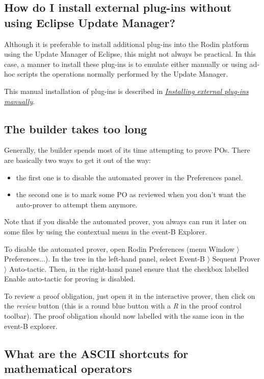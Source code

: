 \subsection{How do I install external plug-ins without using Eclipse Update Manager?}

Although it is preferable to install additional plug-ins into the Rodin platform using the Update Manager of Eclipse, this might not always be practical. In this case, a manner to install these plug-ins is to emulate either manually or using ad-hoc scripts the operations normally performed by the Update Manager. 

This manual installation of plug-ins is described in \href{http://wiki.event-b.org/index.php/Installing_external_plug-ins_manually}{\emph{Installing external plug-ins manually}}. 

\subsection{The builder takes too long}

Generally, the builder spends most of its time attempting to prove POs. There are basically two ways to get it out of the way: 

\begin{itemize}
	\item the first one is to disable the automated prover in the Preferences panel. 
	\item the second one is to mark some PO as reviewed when you don't want the auto-prover to attempt them anymore. 
\end{itemize}

Note that if you disable the automated prover, you always can run it later on some files by using the contextual menu in the event-B Explorer. 

To disable the automated prover, open Rodin Preferences 
(menu \textsf{Window $\rangle$ Preferences...}). In the tree in the left-hand panel, select \textsf{Event-B $\rangle$ Sequent Prover $\rangle$ Auto-tactic}. Then, in the right-hand panel ensure that the checkbox labelled Enable \textsf{auto-tactic} for proving is disabled. 

To review a proof obligation, just open it in the interactive prover, then click on the \emph{review} button (this is a round blue button with a \emph{R} in the proof control toolbar). The proof obligation should now labelled with the same icon in the event-B explorer. 

\subsection{What are the ASCII shortcuts for mathematical operators}

